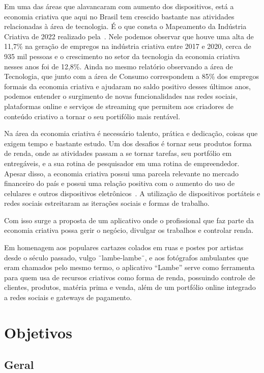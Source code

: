 Em uma das áreas que alavancaram com aumento dos dispositivos, está a economia criativa que aqui no Brasil tem crescido bastante nas atividades relacionadas à área de tecnologia.
É o que consta o Mapeamento da Indústria Criativa de 2022 realizado pela~.
Nele podemos observar que houve uma alta de 11,7\% na geração de empregos na indústria criativa entre 2017 e 2020, cerca de 935 mil pessoas e o crescimento no setor da tecnologia da economia criativa nesses anos foi de 12,8\%.
Ainda no mesmo relatório observando a área de Tecnologia, que junto com a área de Consumo correspondem a 85\% dos empregos formais da economia criativa e ajudaram no saldo positivo desses últimos anos, podemos entender o surgimento de novas funcionalidades nas redes sociais, plataformas online e serviços de streaming que permitem aos criadores de conteúdo criativo a tornar o seu portifólio mais rentável.

Na área da economia criativa é necessário talento, prática e dedicação, coisas que exigem tempo e bastante estudo.
Um dos desafios é tornar seus produtos forma de renda, onde as atividades passam a se tornar tarefas, seu portfólio em entregáveis, e a sua rotina de pesquisador em uma rotina de empreendedor.
Apesar disso, a economia criativa possui uma parcela relevante no mercado financeiro do país e possui uma relação positiva com o aumento do uso de celulares e outros dispositivos eletrônicos~.
A utilização de dispositivos portáteis e redes sociais estreitaram as iterações sociais e formas de trabalho.

Com isso surge a proposta de um aplicativo onde o profissional que faz parte da economia criativa possa gerir o negócio, divulgar os trabalhos e controlar renda.

Em homenagem aos populares cartazes colados em ruas e postes por artistas desde o século passado, vulgo ¨lambe-lambe¨, e aos fotógrafos ambulantes que eram chamados pelo mesmo termo, o aplicativo “Lambe” serve como ferramenta para quem usa de recursos criativos como forma de renda, possuindo controle de clientes, produtos, matéria prima e venda, além de um portfólio online integrado a redes sociais e gateways de pagamento.

\section{Objetivos}\label{sec:objetivos}

\subsection{Geral}\label{subsec:geral}

